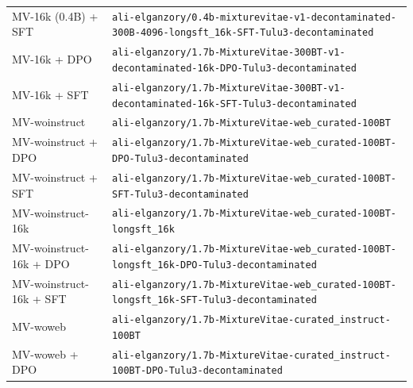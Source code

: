 \begin{table}[ht]
\begin{tabular}{lp{10cm}}
MV-16k (0.4B) + SFT & \texttt{ali-\allowbreak{}elganzory/\allowbreak{}0.4b-\allowbreak{}mixturevitae-\allowbreak{}v1-\allowbreak{}decontaminated-\allowbreak{}300B-\allowbreak{}4096-\allowbreak{}longsft\_16k-\allowbreak{}SFT-\allowbreak{}Tulu3-\allowbreak{}decontaminated} \\
MV-16k + DPO & \texttt{ali-\allowbreak{}elganzory/\allowbreak{}1.7b-\allowbreak{}MixtureVitae-\allowbreak{}300BT-\allowbreak{}v1-\allowbreak{}decontaminated-\allowbreak{}16k-\allowbreak{}DPO-\allowbreak{}Tulu3-\allowbreak{}decontaminated} \\
MV-16k + SFT & \texttt{ali-\allowbreak{}elganzory/\allowbreak{}1.7b-\allowbreak{}MixtureVitae-\allowbreak{}300BT-\allowbreak{}v1-\allowbreak{}decontaminated-\allowbreak{}16k-\allowbreak{}SFT-\allowbreak{}Tulu3-\allowbreak{}decontaminated} \\
MV-woinstruct & \texttt{ali-\allowbreak{}elganzory/\allowbreak{}1.7b-\allowbreak{}MixtureVitae-\allowbreak{}web\_curated-\allowbreak{}100BT} \\
MV-woinstruct + DPO & \texttt{ali-\allowbreak{}elganzory/\allowbreak{}1.7b-\allowbreak{}MixtureVitae-\allowbreak{}web\_curated-\allowbreak{}100BT-\allowbreak{}DPO-\allowbreak{}Tulu3-\allowbreak{}decontaminated} \\
MV-woinstruct + SFT & \texttt{ali-\allowbreak{}elganzory/\allowbreak{}1.7b-\allowbreak{}MixtureVitae-\allowbreak{}web\_curated-\allowbreak{}100BT-\allowbreak{}SFT-\allowbreak{}Tulu3-\allowbreak{}decontaminated} \\
MV-woinstruct-16k & \texttt{ali-\allowbreak{}elganzory/\allowbreak{}1.7b-\allowbreak{}MixtureVitae-\allowbreak{}web\_curated-\allowbreak{}100BT-\allowbreak{}longsft\_16k} \\
MV-woinstruct-16k + DPO & \texttt{ali-\allowbreak{}elganzory/\allowbreak{}1.7b-\allowbreak{}MixtureVitae-\allowbreak{}web\_curated-\allowbreak{}100BT-\allowbreak{}longsft\_16k-\allowbreak{}DPO-\allowbreak{}Tulu3-\allowbreak{}decontaminated} \\
MV-woinstruct-16k + SFT & \texttt{ali-\allowbreak{}elganzory/\allowbreak{}1.7b-\allowbreak{}MixtureVitae-\allowbreak{}web\_curated-\allowbreak{}100BT-\allowbreak{}longsft\_16k-\allowbreak{}SFT-\allowbreak{}Tulu3-\allowbreak{}decontaminated} \\
MV-woweb & \texttt{ali-\allowbreak{}elganzory/\allowbreak{}1.7b-\allowbreak{}MixtureVitae-\allowbreak{}curated\_instruct-\allowbreak{}100BT} \\
MV-woweb + DPO & \texttt{ali-\allowbreak{}elganzory/\allowbreak{}1.7b-\allowbreak{}MixtureVitae-\allowbreak{}curated\_instruct-\allowbreak{}100BT-\allowbreak{}DPO-\allowbreak{}Tulu3-\allowbreak{}decontaminated} \\

\end{tabular}
\end{table}
